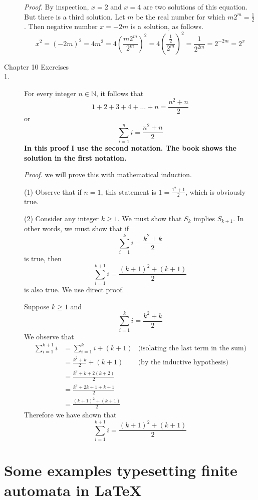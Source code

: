 \documentclass{article}
\begin{document}
\begin{description}
  {\em Proof.}  By inspection, $x=2$ and $x=4$ are two solutions of
  this equation.  But there is a third solution.  Let $m$ be the real
  number for which $m2^m = \frac{1}{2}$.  Then negative number $x=-2m$
  is a solution, as follows.
  \[
  x^2 = (-2m)^2
      = 4m^2
      = 4\left( \frac{m2^m}{2^m} \right)^2
      = 4\left(\frac{\frac{1}{2}}{2^m}\right)^2
      = \frac{1}{2^{2m}}
      = 2^{-2m}
      = 2^x
      \]

\item[Chapter 10 Exercises]

\item[1.] For every integer $n\in\mathbb{N}$, it follows that
  \[
  1 + 2 + 3 + 4 + \ldots + n  = \frac{n^2 + n}{2}
  \]
  or
  \[
  \sum_{i=1}^{n} i  = \frac{n^2 + n}{2}
  \]
  {\bf In this proof I use the second notation.  The book shows the
  solution in the first notation.}

  {\em Proof.}  we will prove this with mathematical induction.

  (1) Observe that if $n=1$, this statement is $1=\frac{1^2 + 1}{2}$,
  which is obviously true.

  (2) Consider any integer $k \geq 1$.  We must show that $S_k$
  implies $S_{k+1}$.  In other words, we must show that if
  \[
  \sum_{i=1}^{k} i = \frac{k^2+k}{2}
  \]
  is true, then
  \[
  \sum_{i=1}^{k+1} i = \frac{(k+1)^2+(k+1)}{2}
  \]
  is also true.  We use direct proof.

  Suppose $k\geq 1$ and 
  \[
  \sum_{i=1}^{k} i = \frac{k^2+k}{2}
  \]
  We observe that
  \begin{align*}
    \sum_{i=1}^{k+1} i
    &= \sum_{i=1}^{k} i + (k+1) &\text{(isolating the last term in the sum)} \\
    &= \frac{k^2+k}{2} + (k+1) & \text{(by the inductive hypothesis)}\\
    &= \frac{k^2 + k + 2(k+2)}{2} \\
    &= \frac{k^2 + 2k + 1 + k + 1}{2}\\
    &= \frac{(k+1)^2 + (k+1)}{2}
  \end{align*}
  Therefore we have shown that 
  \[
  \sum_{i=1}^{k+1} i = \frac{(k+1)^2+(k+1)}{2}
  \]

\end{description}



\section{Some examples typesetting finite automata in \LaTeX}
\end{document}

